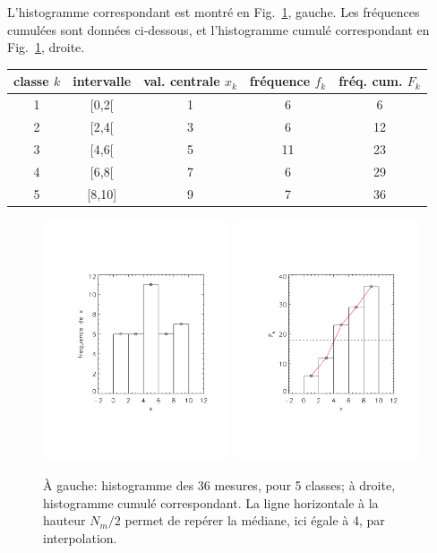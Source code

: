 \documentclass[main.tex]{subfiles}
\begin{document}
L'histogramme correspondant est montré en Fig.~\ref{fig:hcapoabdc}, gauche. Les fréquences cumulées sont données ci-dessous, et l'histogramme cumulé correspondant en Fig.~\ref{fig:hcapoabdc}, droite.
\begin{center}
    \begin{tabular}{ccccc}
        classe $k$ & intervalle & val. centrale $x_k$ & fréquence $f_k$ & fréq. cum. $F_k$ \\\hline
        1          & [0,2[      & 1                   & 6               & 6                \\
        2          & [2,4[      & 3                   & 6               & 12               \\
        3          & [4,6[      & 5                   & 11              & 23               \\
        4          & [6,8[      & 7                   & 6               & 29               \\
        5          & [8,10]     & 9                   & 7               & 36               \\\hline
    \end{tabular}
\end{center}
\begin{figure}[h]
    \centering
    \includegraphics[width=5.5cm]{assets/figures/hist5classes.pdf}\hspace{5mm}
    \includegraphics[width=5.5cm]{assets/figures/histCumul5classes.pdf}
    \caption{À gauche: histogramme des 36 mesures, pour 5 classes; à droite, histogramme cumulé correspondant. La ligne horizontale à la hauteur $N_m/2$ permet de repérer la médiane, ici égale à 4, par interpolation.}
    \label{fig:hcapoabdc}
\end{figure}
\end{document}

